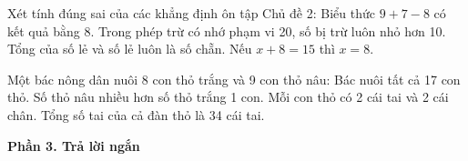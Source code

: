 \begin{ex} %
Xét tính đúng sai của các khẳng định ôn tập Chủ đề 2:
\choiceTF
{\True Biểu thức $9 + 7 - 8$ có kết quả bằng 8.}
{Trong phép trừ có nhớ phạm vi 20, số bị trừ luôn nhỏ hơn 10.}
{\True Tổng của số lẻ và số lẻ luôn là số chẵn.}
{Nếu $x + 8 = 15$ thì $x = 8$.}
\end{ex}

\begin{ex} %
Một bác nông dân nuôi 8 con thỏ trắng và 9 con thỏ nâu:
\choiceTF
{\True Bác nuôi tất cả 17 con thỏ.}
{\True Số thỏ nâu nhiều hơn số thỏ trắng 1 con.}
{Mỗi con thỏ có 2 cái tai và 2 cái chân.}
{\True Tổng số tai của cả đàn thỏ là 34 cái tai.}
\end{ex}

\textbf{Phần 3. Trả lời ngắn}

